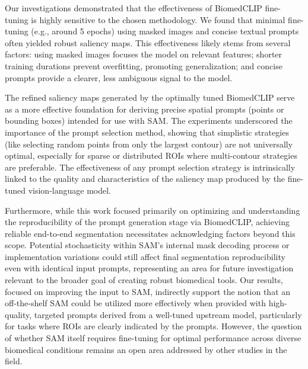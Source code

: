 \documentclass[./dissertation.tex]{subfiles}
\begin{document}
Our investigations demonstrated that the effectiveness of BiomedCLIP fine-tuning is highly sensitive to the chosen methodology. We found that minimal fine-tuning (e.g., around 5 epochs) using masked images and concise textual prompts often yielded robust saliency maps. This effectiveness likely stems from several factors: using masked images focuses the model on relevant features; shorter training durations prevent overfitting, promoting generalization; and concise prompts provide a clearer, less ambiguous signal to the model.

The refined saliency maps generated by the optimally tuned BiomedCLIP serve as a more effective foundation for deriving precise spatial prompts (points or bounding boxes) intended for use with SAM. The experiments underscored the importance of the prompt selection method, showing that simplistic strategies (like selecting random points from only the largest contour) are not universally optimal, especially for sparse or distributed ROIs where multi-contour strategies are preferable. The effectiveness of any prompt selection strategy is intrinsically linked to the quality and characteristics of the saliency map produced by the fine-tuned vision-language model.

Furthermore, while this work focused primarily on optimizing and understanding the reproducibility of the prompt generation stage via BiomedCLIP, achieving reliable end-to-end segmentation necessitates acknowledging factors beyond this scope. Potential stochasticity within SAM's internal mask decoding process or implementation variations could still affect final segmentation reproducibility even with identical input prompts, representing an area for future investigation relevant to the broader goal of creating robust biomedical tools. Our results, focused on improving the input to SAM, indirectly support the notion that an off-the-shelf SAM could be utilized more effectively when provided with high-quality, targeted prompts derived from a well-tuned upstream model, particularly for tasks where ROIs are clearly indicated by the prompts. However, the question of whether SAM itself requires fine-tuning for optimal performance across diverse biomedical conditions remains an open area addressed by other studies in the field.
\end{document}
